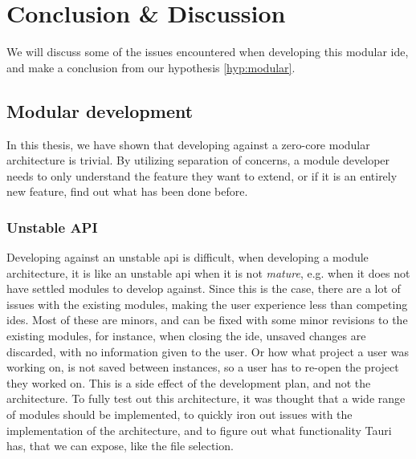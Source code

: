 \chapter{Conclusion \& Discussion} \label{cha:conclusion}

We will discuss some of the issues encountered when developing this modular
\gls*{ide}, and make a conclusion from our hypothesis \ref{hyp:modular}.


\section{Modular development} \label{sec:mod-dev}

In this thesis, we have shown that developing against a zero-core modular
architecture is trivial. By utilizing separation of concerns, a module developer
needs to only understand the feature they want to extend, or if it is an
entirely new feature, find out what has been done before.


\subsection{Unstable API}

Developing against an unstable \gls*{api} is difficult, when developing a module
architecture, it is like an unstable \gls*{api} when it is not \textit{mature},
e.g. when it does not have settled modules to develop against. Since this is
the case, there are a lot of issues with the existing modules, making the user
experience less than competing \gls*{ide}s. Most of these are minors, and can be
fixed with some minor revisions to the existing modules, for instance, when
closing the \gls*{ide}, unsaved changes are discarded, with no information given
to the user. Or how what project a user was working on, is not saved between
instances, so a user has to re-open the project they worked on. This is a side
effect of the development plan, and not the architecture. To fully test out this
architecture, it was thought that a wide range of modules should be implemented,
to quickly iron out issues with the implementation of the architecture, and to
figure out what functionality Tauri has, that we can expose, like the file
selection.

